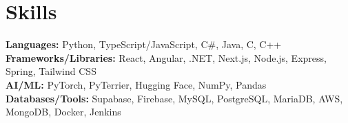 \section{Skills}
    \begin{itemize}[leftmargin=0.15in, label={}]
        \small{\item{
            \textbf{Languages: }{Python, TypeScript/JavaScript, C\#, Java, C, C++} \\
            \textbf{Frameworks/Libraries: }{React, Angular, .NET, Next.js, Node.js, Express, Spring, Tailwind CSS} \\
            \textbf{AI/ML: }{PyTorch, PyTerrier, Hugging Face, NumPy, Pandas} \\
            \textbf{Databases/Tools: }{Supabase, Firebase, MySQL, PostgreSQL, MariaDB, AWS, MongoDB, Docker, Jenkins}
        }}
    \end{itemize}
